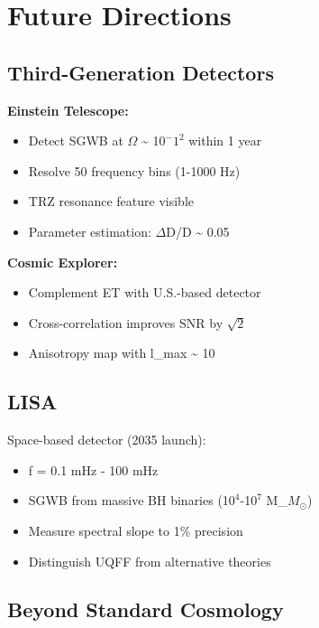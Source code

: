 \documentclass[12pt,a4paper]{article}
\begin{document}
\section{Future Directions}

\subsection{Third-Generation Detectors}

\textbf{Einstein Telescope:}

\begin{itemize}
  \item Detect SGWB at $\Omega$ \textasciitilde{} 1$0^{-}$$1^{2}$ within 1 year
  \item Resolve 50 frequency bins (1-1000 Hz)
  \item TRZ resonance feature visible
  \item Parameter estimation: $\Delta$D/D \textasciitilde{} 0.05
\end{itemize}

\textbf{Cosmic Explorer:}

\begin{itemize}
  \item Complement ET with U.S.-based detector
  \item Cross-correlation improves SNR by $\sqrt{2}$
  \item Anisotropy map with l\_max \textasciitilde{} 10
\end{itemize}

\subsection{LISA}

Space-based detector (2035 launch):

\begin{itemize}
  \item f = 0.1 mHz - 100 mHz
  \item SGWB from massive BH binaries (1$0^{4}$-1$0^{7}$ M\_{$M_{\odot}$})
  \item Measure spectral slope to 1\% precision
  \item Distinguish UQFF from alternative theories
\end{itemize}

\subsection{Beyond Standard Cosmology}
\end{document}
